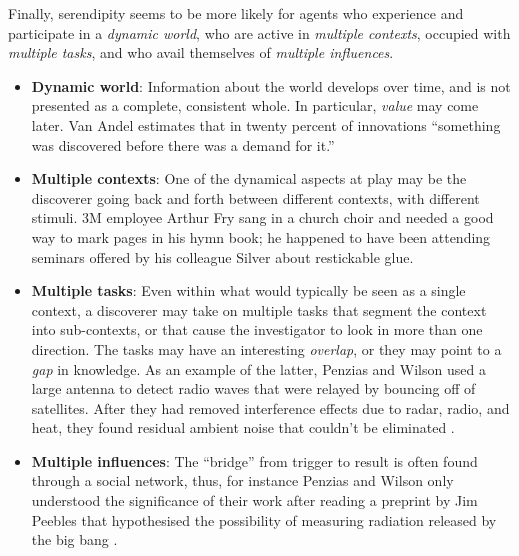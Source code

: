 Finally, serendipity seems to be more likely for agents who experience and participate in a \emph{dynamic world}, who are active in \emph{multiple contexts}, occupied with \emph{multiple tasks}, and who avail themselves of \emph{multiple influences}.

\begin{itemize}
\item \textbf{Dynamic world}: Information about the world develops
  over time, and is not presented as a complete, consistent whole.  In
  particular, \emph{value} may come later.  Van Andel
  \citeyear[p. 643]{van1994anatomy} estimates that in twenty percent
  of innovations ``something was discovered before there was a demand
  for it.''
\end{itemize}

\begin{itemize}
\item \textbf{Multiple contexts}: One of the dynamical aspects at play
  may be the discoverer going back and forth between different
  contexts, with different stimuli.  3M employee Arthur Fry sang in a
  church choir and needed a good way to mark pages in his hymn book;
  he happened to have been attending seminars offered by his colleague
  Silver about restickable glue.
\end{itemize}

\begin{itemize}
\item \textbf{Multiple tasks}: Even within what would typically be
  seen as a single context, a discoverer may take on multiple tasks
  that segment the context into sub-contexts, or that cause the
  investigator to look in more than one direction.  The tasks may have
  an interesting \emph{overlap}, or they may point to a \emph{gap} in
  knowledge.  As an example of the latter, Penzias and Wilson used a
  large antenna to detect radio waves that were relayed by bouncing
  off of satellites.  After they had removed interference effects due
  to radar, radio, and heat, they found residual ambient noise that
  couldn't be eliminated \cite{wiki:cosmic-radiation}.
\end{itemize}

\begin{itemize}
\item \textbf{Multiple influences}: The ``bridge'' from trigger to
  result is often found through a social network, thus, for instance
  Penzias and Wilson only understood the significance of their work
  after reading a preprint by Jim Peebles that hypothesised the
  possibility of measuring radiation released by the big bang
  \cite{wiki:cosmic-radiation}.
\end{itemize}
